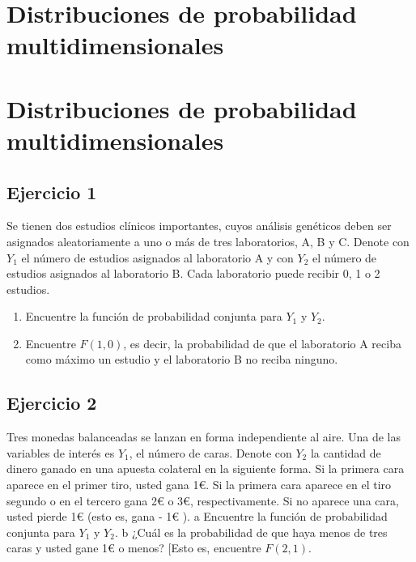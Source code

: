 \documentclass[
]{article}
\begin{document}
\section{Distribuciones de probabilidad multidimensionales}\label{distribuciones-de-probabilidad-multidimensionales}

\section{Distribuciones de probabilidad multidimensionales}\label{distribuciones-de-probabilidad-multidimensionales-1}

\subsection{Ejercicio 1}\label{ejercicio-1}

Se tienen dos estudios clínicos importantes, cuyos análisis genéticos deben ser asignados aleatoriamente a uno o más de tres laboratorios, A, B y C. Denote con \(Y_{1}\) el número de estudios asignados al laboratorio A y con \(Y_{2}\) el número de estudios asignados al laboratorio B. Cada laboratorio puede recibir 0, 1 o 2 estudios.

\begin{enumerate}
\def\labelenumi{\alph{enumi}.}
\item
  Encuentre la función de probabilidad conjunta para \(Y_{1}\) y \(Y_{2}\).
\item
  Encuentre \(F(1,0)\), es decir, la probabilidad de que el laboratorio A reciba como máximo un estudio y el laboratorio B no reciba ninguno.
\end{enumerate}

\subsection{Ejercicio 2}\label{ejercicio-2}

Tres monedas balanceadas se lanzan en forma independiente al aire. Una de las variables de interés es \(Y_{1}\), el número de caras. Denote con \(Y_{2}\) la cantidad de dinero ganado en una apuesta colateral en la siguiente forma. Si la primera cara aparece en el primer tiro, usted gana 1€. Si la primera cara aparece en el tiro segundo o en el tercero gana 2€ o 3€, respectivamente. Si no aparece una cara, usted pierde 1€ (esto es, gana - 1€ ).
a Encuentre la función de probabilidad conjunta para \(Y_{1}\) y \(Y_{2}\).
b ¿Cuál es la probabilidad de que haya menos de tres caras y usted gane 1€ o menos? {[}Esto es, encuentre \(F(2,1)\).
\end{document}
